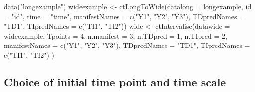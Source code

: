 \documentclass[nojss]{jss}\usepackage[]{graphicx}\usepackage[]{color}
\begin{document}
\begin{Schunk}
\begin{Sinput}
data("longexample")
wideexample <- ctLongToWide(datalong = longexample, id = "id", 
  time = "time", manifestNames = c("Y1", "Y2", "Y3"), 
  TDpredNames = "TD1", TIpredNames = c("TI1", "TI2"))
wide <- ctIntervalise(datawide = wideexample, Tpoints = 4, n.manifest = 3, 
  n.TDpred = 1, n.TIpred = 2, manifestNames = c("Y1", "Y2", "Y3"), 
  TDpredNames = "TD1", TIpredNames = c("TI1", "TI2") )
\end{Sinput}
\end{Schunk}

\subsection{Choice of initial time point and time scale} \label{sec:datatimescale}\nopagebreak
\end{document}
